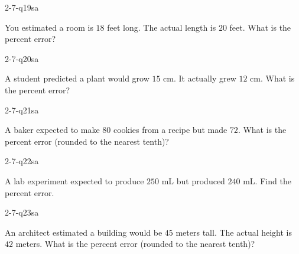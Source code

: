 
\begin{practiceQuestion}{2-7-q19}{sa}
\begin{questionText}
You estimated a room is $18$ feet long. The actual length is $20$ feet. What is the percent error?
\end{questionText}
\end{practiceQuestion}

\begin{practiceQuestion}{2-7-q20}{sa}
\begin{questionText}
A student predicted a plant would grow $15$ cm. It actually grew $12$ cm. What is the percent error?
\end{questionText}
\end{practiceQuestion}

\begin{practiceQuestion}{2-7-q21}{sa}
\begin{questionText}
A baker expected to make $80$ cookies from a recipe but made $72$. What is the percent error (rounded to the nearest tenth)?
\end{questionText}
\end{practiceQuestion}

\begin{practiceQuestion}{2-7-q22}{sa}
\begin{questionText}
A lab experiment expected to produce $250$ mL but produced $240$ mL. Find the percent error.
\end{questionText}
\end{practiceQuestion}

\begin{practiceQuestion}{2-7-q23}{sa}
\begin{questionText}
An architect estimated a building would be $45$ meters tall. The actual height is $42$ meters. What is the percent error (rounded to the nearest tenth)?
\end{questionText}
\end{practiceQuestion}

